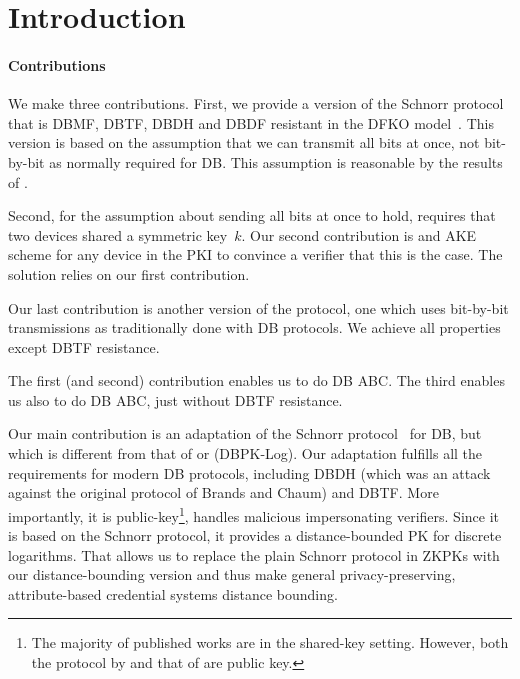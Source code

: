 \section{Introduction}%
\label{Introduction}

\paragraph*{Contributions}

We make three contributions.
First, we provide a version of the Schnorr protocol that is \ac{DBMF}, 
\ac{DBTF}, \ac{DBDH} and \ac{DBDF} resistant in the DFKO 
model~\cite{DB-DFKO,FormalTerroristFraud,TREAD}.
This version is based on the assumption that we can transmit all bits at once, 
not bit-by-bit as normally required for \ac{DB}.
This assumption is reasonable by the results of \textcite{UWBPR}.

Second, for the assumption about sending all bits at once to hold, 
\textcite{UWBPR} requires that two devices shared a symmetric key~\(k\).
Our second contribution is  and \ac{AKE} scheme for any device in 
the \ac{PKI} to convince a verifier that this is the case.
The solution relies on our first contribution.

Our last contribution is another version of the protocol, one which uses 
bit-by-bit transmissions as traditionally done with \ac{DB} protocols.
We achieve all properties except \ac{DBTF} resistance.

The first (and second) contribution enables us to do \ac{DB} \ac{ABC}.
The third enables us also to do \ac{DB} \ac{ABC}, just without \ac{DBTF} 
resistance.

Our main contribution is an adaptation of the Schnorr protocol~\cite{Schnorr} 
for \ac{DB}, but which is different from that of \textcite{DistanceBounding} or 
\textcite{Bussard-Bagga} (DBPK-Log).
Our adaptation fulfills all the requirements for modern \ac{DB} protocols, 
including \ac{DBDH} (which was an attack against the original protocol of 
Brands and Chaum) and \ac{DBTF}.
More importantly, it is public-key\footnote{%
  The majority of published works are in the shared-key setting.
  However, both the protocol by \textcite{DistanceBounding} and that of 
  \textcite{Bussard-Bagga} are public key.
}, handles malicious impersonating verifiers.
Since it is based on the Schnorr protocol, it provides a distance-bounded 
\ac{PK} for discrete logarithms.
That allows us to replace the plain Schnorr protocol in \acp{ZKPK} with our 
distance-bounding version and thus make general privacy-preserving, 
attribute-based credential systems distance bounding.

